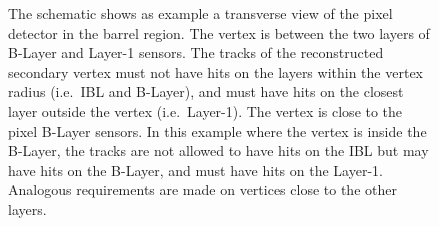 \documentclass[PUB,UKenglish, texlive=2018]{\ATLASLATEXPATH atlasdoc}
\begin{document}
\begin{figure}[t]
\begin{center}
\caption{The schematic shows as example a transverse view of the pixel detector in the barrel region.  
The vertex is between the two layers of B-Layer and Layer-1 sensors.
The tracks of the reconstructed secondary vertex must not have hits on the layers within the vertex radius (i.e.~IBL and B-Layer), 
and must have hits on the closest layer outside the vertex (i.e.~Layer-1). 
 The vertex is close to the pixel B-Layer sensors. 
In this example where the vertex is inside the B-Layer, 
the tracks are not allowed to have hits on the IBL but may have hits on the B-Layer, and must have hits on the Layer-1. 
Analogous requirements are made on vertices close to the other layers.
}
\label{fig:fakeRejScheme}
\end{center}


\end{figure}
\end{document}

